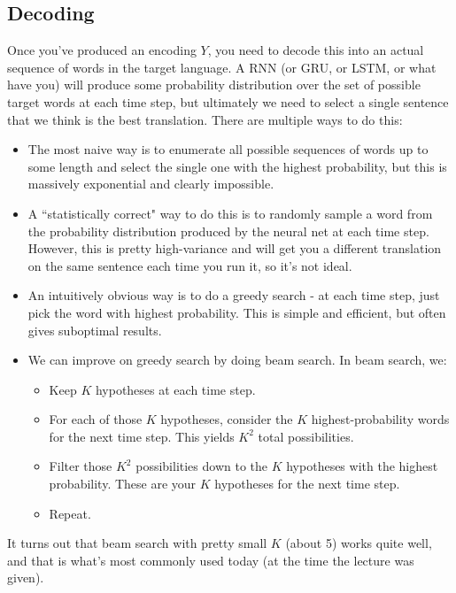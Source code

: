 \subsection{Decoding}
Once you've produced an encoding $Y$, you need to decode this into an actual sequence of words in the target language. A RNN (or GRU, or LSTM, or what have you) will produce some probability distribution over the set of possible target words at each time step, but ultimately we need to select a single sentence that we think is the best translation. There are multiple ways to do this:
\begin{itemize}
\item The most naive way is to enumerate all possible sequences of words up to some length and select the single one with the highest probability, but this is massively exponential and clearly impossible.
\item A ``statistically correct" way to do this is to randomly sample a word from the probability distribution produced by the neural net at each time step. However, this is pretty high-variance and will get you a different translation on the same sentence each time you run it, so it's not ideal.
\item An intuitively obvious way is to do a greedy search - at each time step, just pick the word with highest probability. This is simple and efficient, but often gives suboptimal results.
\item We can improve on greedy search by doing beam search. In beam search, we:
\begin{itemize}
\item Keep $K$ hypotheses at each time step.
\item For each of those $K$ hypotheses, consider the $K$ highest-probability words for the next time step. This yields $K^2$ total possibilities.
\item Filter those $K^2$ possibilities down to the $K$ hypotheses with the highest probability. These are your $K$ hypotheses for the next time step.
\item Repeat.
\end{itemize}
\end{itemize}
It turns out that beam search with pretty small $K$ (about 5) works quite well, and that is what's most commonly used today (at the time the lecture was given).
